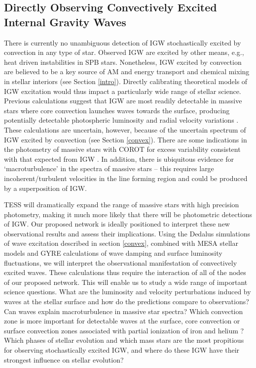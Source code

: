 \subsection{Directly Observing Convectively Excited Internal Gravity Waves}

There is currently no unambiguous detection of IGW stochastically excited by convection in any type of star. {\color{green} Observed IGW are excited by other means, e.g., heat driven instabilities in SPB stars.} Nonetheless, IGW excited by convection are believed to be a key source of AM and energy transport and chemical mixing in stellar interiors (see Section \ref{intro}).  Directly calibrating theoretical models of IGW excitation would thus impact a particularly wide range of stellar science. Previous calculations suggest that IGW are most readily detectable in massive stars where core convection launches waves towards the surface, producing potentially detectable photospheric luminosity and radial velocity variations \citep{samadi2010,shiode2013}. These calculations are uncertain, however, because of the uncertain spectrum of IGW excited by convection (see Section \ref{convex}).  There are some indications in the photometry of massive stars with COROT for excess variability consistent with that expected from IGW \citep{Aerts2015}.  In addition, there is ubiquitous evidence for `macroturbulence' in the spectra of massive stars -- this requires large incoherent/turbulent velocities in the line forming region and could be produced by a superposition of IGW.

TESS will dramatically expand the range of massive stars with high precision photometry, making it much more likely that there will be photometric detections of IGW. Our proposed network is ideally positioned to interpret these new observational results and assess their implications.  Using the Dedalus simulations of wave excitation described in section \ref{convex}, combined with MESA stellar models and GYRE calculations of wave damping and surface luminosity fluctuations, we will interpret the observational manifestation of convectively excited waves. {\color{green} These calculations thus require the interaction of all of the nodes of our proposed network.} This will enable us to study a wide range of important science questions. What are the luminosity and velocity perturbations induced by waves at the stellar surface and how do the predictions compare to observations? Can waves explain macroturbulence in massive star spectra? Which convection zone is more important for detectable waves at the surface, core convection or surface convection zones associated with partial ionization of iron and helium \citep{Cantiello2009}? Which phases of stellar evolution and which mass stars are the most propitious for observing stochastically excited IGW, and where do these IGW have their strongest influence on stellar evolution? 
